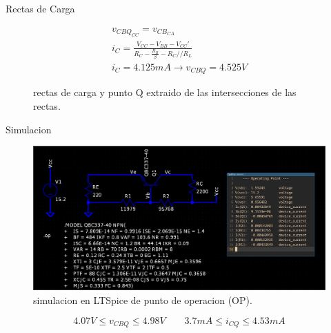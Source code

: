 \begin{frame}[allowframebreaks]{Rectas de Carga}
  \begin{figure}[!h]
    \centering
    \begin{minipage}{0.45\textwidth}
      \centering
    \end{minipage}
    \hfill
    \begin{minipage}{0.45\textwidth}
      \begin{gather*}
        v_{CBQ_{CC}} = v_{CB_{CA}}\\[6pt]
        i_C = \frac{V_{CC} - V_{BB} - V_{CC}'}{R_C - \frac{R_B}{\beta} - R_C // R_L}\\[6pt]
        i_C = 4.125mA \to v_{CBQ} = 4.525V
      \end{gather*}
    \end{minipage}
    \caption{rectas de carga y punto Q extraido de las intersecciones de las rectas.}
  \end{figure}

\end{frame}

\begin{frame}{Simulacion}
  \begin{figure}[!ht]
    \centering
    \includegraphics[width=.9\textwidth]{images/sim_calculada.png}
    \caption{simulacion en LTSpice de punto de operacion (OP).}
  \end{figure}
  \begin{equation*}
    4.07V \leq v_{CBQ} \leq 4.98V \quad \quad 3.7mA \leq i_{CQ} \leq 4.53mA
  \end{equation*}
\end{frame}

